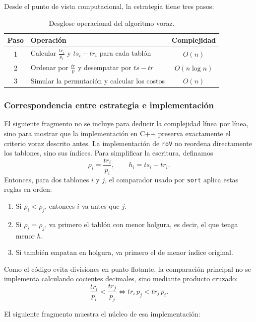 \documentclass[12pt,a4paper]{article}
\begin{document}
Desde el punto de vista computacional, la estrategia tiene tres pasos:

\begin{table}[H]
  \centering
  \begin{tabular}{clc}
    \toprule
    Paso & Operaci\'on & Complejidad \\
    \midrule
    1 & Calcular \(\frac{tr_i}{p_i}\) y \(ts_i-tr_i\) para cada tabl\'on & \(O(n)\) \\
    2 & Ordenar por \(\frac{tr}{p}\) y desempatar por \(ts-tr\) & \(O(n\log n)\) \\
    3 & Simular la permutaci\'on y calcular los costos & \(O(n)\) \\
    \bottomrule
  \end{tabular}
  \caption{Desglose operacional del algoritmo voraz.}
\end{table}

\subsubsection{Correspondencia entre estrategia e implementaci\'on}

El siguiente fragmento no se incluye para deducir la complejidad l\'inea por l\'inea, sino para mostrar que la implementaci\'on en C++ preserva exactamente el criterio voraz descrito antes. La implementaci\'on de \texttt{roV} no reordena directamente los tablones, sino sus \'indices. Para simplificar la escritura, definamos
\[
\rho_i=\frac{tr_i}{p_i},
\qquad
h_i=ts_i-tr_i.
\]
Entonces, para dos tablones \(i\) y \(j\), el comparador usado por \texttt{sort} aplica estas reglas en orden:
\begin{enumerate}
  \item Si \(\rho_i<\rho_j\), entonces \(i\) va antes que \(j\).
  \item Si \(\rho_i=\rho_j\), va primero el tabl\'on con menor holgura, es decir, el que tenga menor \(h\).
  \item Si tambi\'en empatan en holgura, va primero el de menor \'indice original.
\end{enumerate}

Como el c\'odigo evita divisiones en punto flotante, la comparaci\'on principal no se implementa calculando cocientes decimales, sino mediante producto cruzado:
\[
\frac{tr_i}{p_i}<\frac{tr_j}{p_j}
\iff
tr_i\,p_j < tr_j\,p_i.
\]

El siguiente fragmento muestra el n\'ucleo de esa implementaci\'on:
\end{document}
